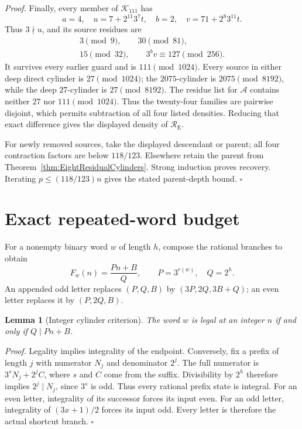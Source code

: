 \documentclass[11pt,letterpaper]{article}
\newtheorem{lemma}[theorem]{Lemma}
\newenvironment{proof}{\noindent\textit{Proof.}}{\hfill\(\square\)}
\begin{document}
\begin{proof}
Finally, every member of \(\mathcal K_{111}\) has
\[
a=4,
\quad u=7+2^{11}3^7t,
\quad b=2,
\quad v=71+2^8 3^{11}t.
\]
Thus \(3\nmid u\), and its source residues are
\[
\begin{gathered}
3\pmod9,\qquad30\pmod{81},\\
15\pmod{32},\qquad3^bv\equiv127\pmod{256}.
\end{gathered}
\]
It survives every earlier guard and is \(111\pmod{1024}\). Every source
in either deep direct cylinder is \(27\pmod{1024}\); the \(2075\)-cylinder
is \(2075\pmod{8192}\), while the deep \(27\)-cylinder is
\(27\pmod{8192}\). The residue list for \(\mathcal A\) contains neither
\(27\) nor \(111\pmod{1024}\). Thus the twenty-four families are pairwise
disjoint, which permits subtraction of all four listed densities. Reducing
that exact difference gives the displayed density of
\(\mathcal R_{\mathrm E}\).

For newly removed sources, take the displayed descendant or parent; all four
contraction factors are below \(118/123\). Elsewhere retain the parent from
Theorem~\ref{thm:EightResidualCylinders}. Strong induction proves recovery.
Iterating \(p\le(118/123)n\) gives the stated parent-depth bound.
\end{proof}
\section{Exact repeated-word budget}

For a nonempty binary word \(w\) of length \(h\), compose the rational
branches to obtain
\[
F_w(n)=\frac{Pn+B}{Q},\qquad P=3^{r(w)},\quad Q=2^h.
\]
An appended odd letter replaces \((P,Q,B)\) by
\((3P,2Q,3B+Q)\); an even letter replaces it by \((P,2Q,B)\).

\begin{lemma}[Integer cylinder criterion]\label{lem:IntegerCylinder}
The word \(w\) is legal at an integer \(n\) if and only if \(Q\mid Pn+B\).
\end{lemma}
\begin{proof}
Legality implies integrality of the endpoint. Conversely, fix a prefix
of length \(j\) with numerator \(N_j\) and denominator \(2^j\).
The full numerator is \(3^sN_j+2^jC\), where \(s\) and \(C\) come from
the suffix. Divisibility by \(2^h\) therefore implies \(2^j\mid N_j\),
since \(3^s\) is odd. Thus every rational prefix state is integral.
For an even letter, integrality of its successor forces its input even.
For an odd letter, integrality of \((3x+1)/2\) forces its input odd.
Every letter is therefore the actual shortcut branch.
\end{proof}
\end{document}
